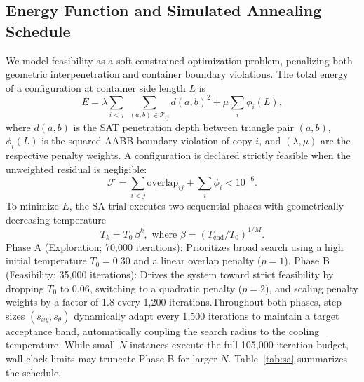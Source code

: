\documentclass[10pt]{article}
\begin{document}
\subsection{Energy Function and Simulated Annealing Schedule}
We model feasibility as a soft-constrained optimization problem, penalizing both 
geometric interpenetration and container boundary violations. 
The total energy of a configuration at container side length
 $L$ is$$E = \lambda \sum_{i<j}\;\sum_{(a,b)\in\mathcal{T}_{ij}}d(a,b)^{2} + \mu \sum_i \phi_i(L), \label{eq:energy}$$
 where $d(a,b)$ is the SAT penetration depth between triangle pair $(a, b)$, $\phi_i(L)$ is the squared AABB 
 boundary violation of copy $i$, and $(\lambda, \mu)$ are the respective penalty weights. A configuration
  is declared strictly feasible when the unweighted residual is negligible:
  $$\mathcal{F} = \sum_{i<j} \text{overlap}_{ij} + \sum_i \phi_i < 10^{-6}.$$To minimize $E$, the SA trial 
  executes two sequential phases with geometrically decreasing temperature
   $$T_k = T_0\,\beta^k, \text{ where } \beta = (T_{\mathrm{end}}/T_0)^{1/M}.$$
   Phase A (Exploration; 70{,}000 iterations): 
   Prioritizes broad search using a high initial temperature $T_0 = 0.30$ and a linear overlap penalty ($p = 1$).
   Phase B (Feasibility; 35{,}000 iterations): Drives the system toward strict feasibility 
   by dropping $T_0$ to $0.06$, switching to a quadratic penalty ($p = 2$), and scaling penalty weights by 
   a factor of 1.8 every 1{,}200 iterations.Throughout both phases, step sizes $(s_{xy}, s_\theta)$ 
   dynamically adapt every 1{,}500 iterations to maintain a target acceptance band, automatically coupling 
   the search radius to the cooling temperature. While small $N$ instances execute the full
    105{,}000-iteration budget, wall-clock limits may truncate Phase B for larger $N$. Table~\ref{tab:sa} 
    summarizes the schedule.
\end{document}
